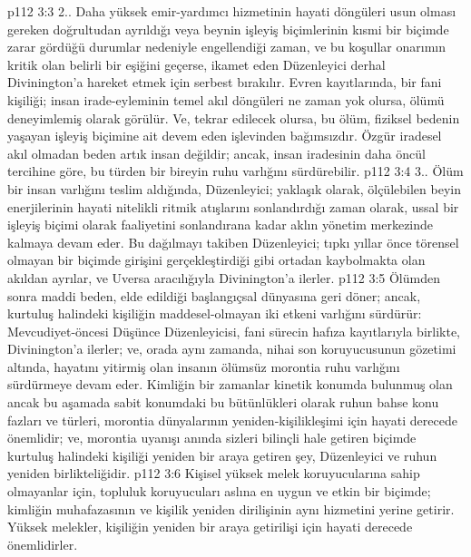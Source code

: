 \vs p112 3:3 2.. Daha yüksek emir\hyp{}yardımcı hizmetinin hayati döngüleri usun olması gereken doğrultudan ayrıldığı veya beynin işleyiş biçimlerinin kısmi bir biçimde zarar gördüğü durumlar nedeniyle engellendiği zaman, ve bu koşullar onarımın kritik olan belirli bir eşiğini geçerse, ikamet eden Düzenleyici derhal Divinington’a hareket etmek için serbest bırakılır. Evren kayıtlarında, bir fani kişiliği; insan irade\hyp{}eyleminin temel akıl döngüleri ne zaman yok olursa, ölümü deneyimlemiş olarak görülür. Ve, tekrar edilecek olursa, bu ölüm, fiziksel bedenin yaşayan işleyiş biçimine ait devem eden işlevinden bağımsızdır. Özgür iradesel akıl olmadan beden artık insan değildir; ancak, insan iradesinin daha öncül tercihine göre, bu türden bir bireyin ruhu varlığını sürdürebilir.
\vs p112 3:4 3.\bibnobreakspace {}. Ölüm bir insan varlığını teslim aldığında, Düzenleyici; yaklaşık olarak, ölçülebilen beyin enerjilerinin hayati nitelikli ritmik atışlarını sonlandırdığı zaman olarak, ussal bir işleyiş biçimi olarak faaliyetini sonlandırana kadar aklın yönetim merkezinde kalmaya devam eder. Bu dağılmayı takiben Düzenleyici; tıpkı yıllar önce törensel olmayan bir biçimde girişini gerçekleştirdiği gibi ortadan kaybolmakta olan akıldan ayrılar, ve Uversa aracılığıyla Divinington’a ilerler.
\vs p112 3:5 Ölümden sonra maddi beden, elde edildiği başlangıçsal dünyasına geri döner; ancak, kurtuluş halindeki kişiliğin maddesel\hyp{}olmayan iki etkeni varlığını sürdürür: Mevcudiyet\hyp{}öncesi Düşünce Düzenleyicisi, fani sürecin hafıza kayıtlarıyla birlikte, Divinington’a ilerler; ve, orada aynı zamanda, nihai son koruyucusunun gözetimi altında, hayatını yitirmiş olan insanın ölümsüz morontia ruhu varlığını sürdürmeye devam eder. Kimliğin bir zamanlar kinetik konumda bulunmuş olan ancak bu aşamada sabit konumdaki bu bütünlükleri olarak ruhun bahse konu fazları ve türleri, morontia dünyalarının yeniden\hyp{}kişilikleşimi için hayati derecede önemlidir; ve, morontia uyanışı anında sizleri bilinçli hale getiren biçimde kurtuluş halindeki kişiliği yeniden bir araya getiren şey, Düzenleyici ve ruhun yeniden birlikteliğidir.
\vs p112 3:6 Kişisel yüksek melek koruyucularına sahip olmayanlar için, topluluk koruyucuları aslına en uygun ve etkin bir biçimde; kimliğin muhafazasının ve kişilik yeniden dirilişinin aynı hizmetini yerine getirir. Yüksek melekler, kişiliğin yeniden bir araya getirilişi için hayati derecede önemlidirler.
